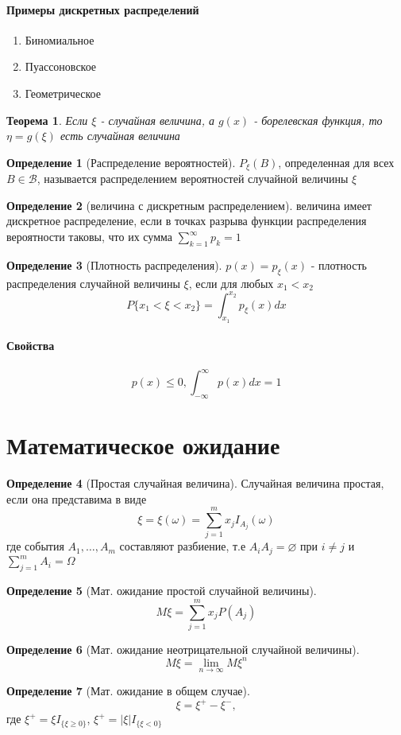 \documentclass[a4paper]{article}
\newtheorem{theorem}{Теорема}[section]
\theoremstyle{definition}
\newtheorem*{definition}{Определение}
\theoremstyle{remark}
\begin{document}
\paragraph*{Примеры дискретных распределений}
\begin{enumerate}
    \item Биномиальное
    \item Пуассоновское
    \item Геометрическое
\end{enumerate}
\begin{theorem}
    Если $\xi$ - случайная величина, а $g(x)$ - борелевская функция, то $\eta = g(\xi)$ есть случайная величина
\end{theorem}
\begin{definition}[Распределение вероятностей]
    $P_\xi(B)$, определенная для всех $B\in \mathscr{B}$, называется распределением вероятностей случайной величины $\xi$
\end{definition}
\begin{definition}[величина с дискретным распределением]
    величина имеет дискретное распределение, если в точках разрыва
    функции распределения вероятности таковы, что их сумма $\sum_{k = 1}^{\infty} p_k  = 1$

\end{definition}
    
\begin{definition}[Плотность распределения]
    $p(x) = p_\xi(x)$ - плотность распределения случайной величины $\xi$, если для любых $x_1 < x_2$
    \[P\{x_1 < \xi < x_2\} = \int_{x_1}^{x_2}p_\xi (x)dx\]
\end{definition}
\paragraph*{Свойства}
\[p(x)\le 0, \int_{-\infty}^{\infty} p(x)dx = 1\]
\section{Математическое ожидание}
\begin{definition}[Простая случайная величина]
    Случайная величина простая, если она представима в виде
    \[\xi = \xi (\omega) = \sum_{j = 1}^m x_j I_{A_j}(\omega)\]
    где события $A_1, \dots, A_m$ составляют разбиение, т.е $A_i A_j = \varnothing$ при $i \neq j$ и $\sum_{j = 1}^m A_i = \Omega$
\end{definition}
\begin{definition}[Мат. ожидание простой случайной величины]
    \[M\xi = \sum_{j = 1}^m x_j P(A_j)\]
\end{definition}
\begin{definition}[Мат. ожидание неотрицательной случайной величины]
    \[M\xi = \lim_{n\to \infty} M\xi^n\]
\end{definition}
\begin{definition}[Мат. ожидание в общем случае]
    \[\xi = \xi^+ - \xi^-,\] где \(\xi^+ = \xi I_{\{\xi\geq 0\}}\), \(\xi^+ = |\xi| I_{\{\xi< 0\}}\)
\end{definition}
\end{document}

